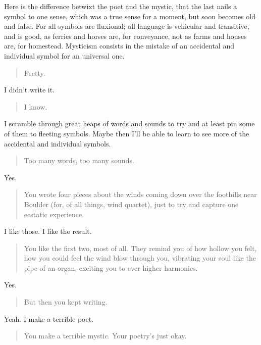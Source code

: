 Here is the difference betwixt the poet and the mystic, that the last nails a symbol to one sense, which was a true sense for a moment, but soon becomes old and false. For all symbols are fluxional; all language is vehicular and transitive, and is good, as ferries and horses are, for conveyance, not as farms and houses are, for homestead. Mysticism consists in the mistake of an accidental and individual symbol for an universal one.

\begin{quote}
Pretty.
\end{quote}

I didn't write it.

\begin{quote}
I know.
\end{quote}

I scramble through great heaps of words and sounds to try and at least pin some of them to fleeting symbols. Maybe then I'll be able to learn to see more of the accidental and individual symbols.

\begin{quote}
Too many words, too many sounds.
\end{quote}

Yes.

\begin{quote}
You wrote four pieces about the winds coming down over the foothills near Boulder (for, of all things, wind quartet), just to try and capture one ecstatic experience.
\end{quote}

I like those. I like the result.

\begin{quote}
You like the first two, most of all. They remind you of how hollow you felt, how you could feel the wind blow through you, vibrating your soul like the pipe of an organ, exciting you to ever higher harmonics.
\end{quote}

Yes.

\begin{quote}
But then you kept writing.
\end{quote}

Yeah. I make a terrible poet.

\begin{quote}
You make a terrible mystic. Your poetry's just okay.
\end{quote}
